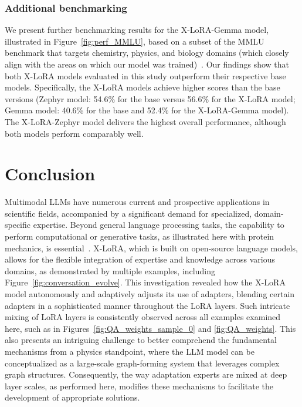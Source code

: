 \subsubsection{Additional benchmarking} We present further benchmarking results for the X-LoRA-Gemma model, illustrated in Figure~\ref{fig:perf_MMLU}, based on a subset of the MMLU benchmark that targets chemistry, physics, and biology domains (which closely align with the areas on which our model was trained)~\cite{Hendrycks2020MeasuringUnderstanding}. Our findings show that both X-LoRA models evaluated in this study outperform their respective base models. Specifically, the X-LoRA models achieve higher scores than the base versions (Zephyr model: 54.6\% for the base versus 56.6\% for the X-LoRA model; Gemma model: 40.6\% for the base and 52.4\% for the X-LoRA-Gemma model). The X-LoRA-Zephyr model delivers the highest overall performance, although both models perform comparably well.

\section{Conclusion}

Multimodal LLMs have numerous current and prospective applications in scientific fields, accompanied by a significant demand for specialized, domain-specific expertise. Beyond general language processing tasks, the capability to perform computational or generative tasks, as illustrated here with protein mechanics, is essential~\cite{Luu2023BioinspiredLLM:Materials,Buehler2023MechGPTModalities,Buehler2023MeLMProblemsb}. X-LoRA, which is built on open-source language models, allows for the flexible integration of expertise and knowledge across various domains, as demonstrated by multiple examples, including Figure~\ref{fig:conversation_evolve}. This investigation revealed how the X-LoRA model autonomously and adaptively adjusts its use of adapters, blending certain adapters in a sophisticated manner throughout the LoRA layers. Such intricate mixing of LoRA layers is consistently observed across all examples examined here, such as in Figures~\ref{fig:QA_weights_sample_0} and \ref{fig:QA_weights}. This also presents an intriguing challenge to better comprehend the fundamental mechanisms from a physics standpoint, where the LLM model can be conceptualized as a large-scale graph-forming system that leverages complex graph structures. Consequently, the way adaptation experts are mixed at deep layer scales, as performed here, modifies these mechanisms to facilitate the development of appropriate solutions.

